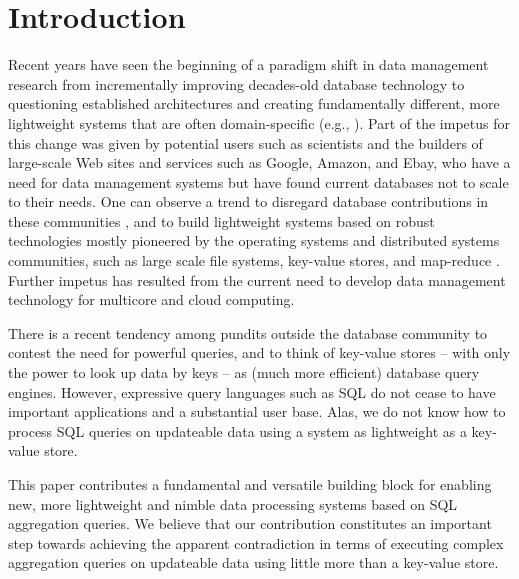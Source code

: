 \section{Introduction}


Recent years have seen the beginning of a paradigm shift in data management
research from incrementally improving decades-old database technology
to questioning established architectures 
and creating fundamentally different, more lightweight systems
that are often domain-specific
(e.g.,
\cite{DBLP:conf/vldb/StonebrakerMAHHH07,DBLP:journals/pvldb/KallmanKNPRZJMSZHA08}).
Part of the impetus for this change was given by 
potential users such as scientists and the builders of
large-scale Web sites and services such as Google, Amazon, and Ebay,
who have a need for data management systems but have found current databases
not to scale to their needs.
One can observe a trend to disregard database contributions
in these communities \cite{dbcolumn, DBLP:conf/sigmod/PavloPRADMS09}, and to build lightweight systems based on
robust technologies mostly pioneered by the operating systems and distributed
systems communities, such as large scale file systems, key-value stores, and
map-reduce
\cite{DBLP:journals/cacm/DeanG08, DBLP:journals/tocs/ChangDGHWBCFG08}.
Further impetus has resulted from the current need to develop data management
technology for multicore and cloud computing.
%

There is a recent tendency
among pundits
outside the database community to
contest the need for powerful queries, and to
think of key-value stores -- with only the power to look up data by
keys -- as (much more efficient) database query engines.
%
%
However, expressive query languages such as SQL do not cease to have
important applications and a substantial user base.
Alas, we do not know how to process SQL queries on updateable data
using a system as lightweight as a key-value store.

This paper contributes a fundamental and versatile building block for
enabling new, more lightweight and nimble data processing systems based
on SQL aggregation que\-ries. We believe that our contribution
constitutes an important
step towards achieving the apparent contradiction in terms of
executing complex aggregation queries on updateable data
using little more than a key-value store.

